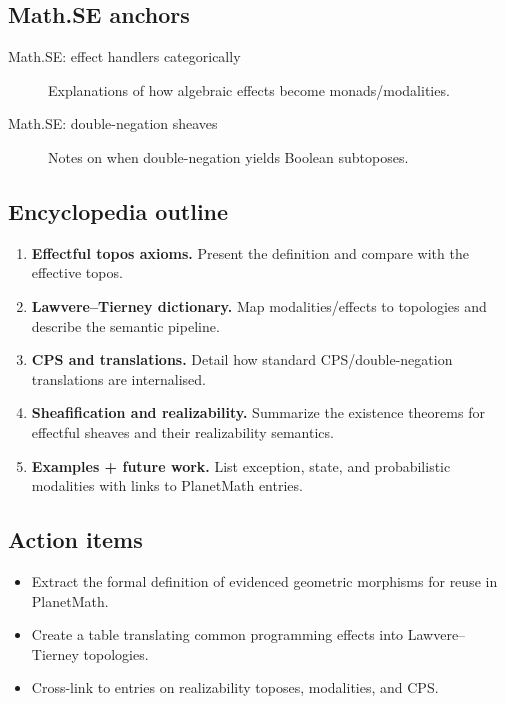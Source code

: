 \subsection*{Math.SE anchors}
\begin{description}
  \item[Math.SE: effect handlers categorically] Explanations of how algebraic effects become monads/modalities.
  \item[Math.SE: double-negation sheaves] Notes on when double-negation yields Boolean subtoposes.
\end{description}
\subsection*{Encyclopedia outline}
\begin{enumerate}
  \item \textbf{Effectful topos axioms.} Present the definition and compare with the effective topos.
  \item \textbf{Lawvere--Tierney dictionary.} Map modalities/effects to topologies and describe the semantic pipeline.
  \item \textbf{CPS and translations.} Detail how standard CPS/double-negation translations are internalised.
  \item \textbf{Sheafification and realizability.} Summarize the existence theorems for effectful sheaves and their realizability semantics.
  \item \textbf{Examples + future work.} List exception, state, and probabilistic modalities with links to PlanetMath entries.
\end{enumerate}
\subsection*{Action items}
\begin{itemize}
  \item Extract the formal definition of evidenced geometric morphisms for reuse in PlanetMath.
  \item Create a table translating common programming effects into Lawvere--Tierney topologies.
  \item Cross-link to entries on realizability toposes, modalities, and CPS.
\end{itemize}
